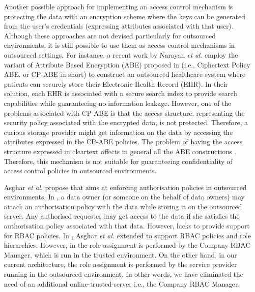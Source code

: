 \documentclass[final,5p,times,twocolumn]{elsarticle}
\begin{document}
Another possible approach for implementing an access control mechanism is protecting the data with an encryption scheme where the keys can be generated from the user's credentials (expressing attributes associated with that user). Although these approaches are not devised particularly for outsourced environments, it is still possible to use them as access control mechanisms in outsourced settings. For instance, a recent work by Narayan \emph{et al.} \cite{Narayan2010} employ the variant of Attribute Based Encryption (ABE) proposed in \cite{Bethencourt2007} (i.e., Ciphertext Policy ABE, or CP-ABE in short) to construct an outsourced healthcare system where patients can securely store their Electronic Health Record (EHR). In their solution, each EHR is associated with a secure search index to provide search capabilities while guaranteeing no information leakage. However, one of the problems associated with CP-ABE is that the access structure, representing the security policy associated with the encrypted data, is not protected. Therefore, a curious storage provider might get information on the data by accessing the attributes expressed in the CP-ABE policies. The problem of having the access structure expressed in cleartext affects in general all the ABE constructions \cite{Sahai2005, Goyal2006, Ostrovsky2007, Bethencourt2007}. Therefore, this mechanism is not suitable for guaranteeing confidentiality of access control policies in outsourced environments.

Asghar \emph{et al.} \cite{Asghar2011ARES} propose  that aims at enforcing authorisation policies in outsourced environments. In , a data owner (or someone on the behalf of data owners) may attach an authorisation policy with the data while storing it on the outsourced server. Any authorised requester may get access to the data if she satisfies the authorisation policy associated with that data. However,  lacks to provide support for RBAC policies. In \cite{Asghar2011CCS}, Asghar \emph{et al.} extended  to support RBAC policies and role hierarchies. However, in \cite{Asghar2011CCS} the role assignment is performed by the Company RBAC Manager, which is run in the trusted environment. On the other hand, in our current architecture, the role assignment is performed by the service provider running in the outsourced environment. In other words, we have eliminated the need of an additional online-trusted-server i.e., the Company RBAC Manager.
\end{document}
